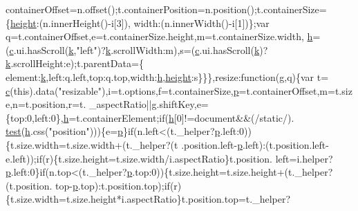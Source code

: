 \begin{DoxyCode}
      containerOffset=n.offset();t.containerPosition=n.position();t.containerSize=\{\hyperlink{styr_2styr_2main_8c_a48083b65ac9a863566dc3e3fff09a5b4}{height}:(n.innerHeight()-i[3]),
      width:(n.innerWidth()-i[1])\};var q=t.containerOffset,e=t.containerSize.height,m=t.containerSize.width,
      \hyperlink{all__1a_8js_aebecdaf2444e2be39f4804412d6a3bf8}{h}=(\hyperlink{jquery_8js_ad171626e81625b5e9f5cb177a3a8fb1c}{c}.ui.hasScroll(\hyperlink{jquery_8js_ab26645c014aa005ecedef329ecf58c99}{k},\textcolor{stringliteral}{"left"})?\hyperlink{jquery_8js_ab26645c014aa005ecedef329ecf58c99}{k}.scrollWidth:m),s=(\hyperlink{jquery_8js_ad171626e81625b5e9f5cb177a3a8fb1c}{c}.ui.hasScroll(\hyperlink{jquery_8js_ab26645c014aa005ecedef329ecf58c99}{k})?\hyperlink{jquery_8js_ab26645c014aa005ecedef329ecf58c99}{k}.scrollHeight:e);t.parentData=\{
      element:\hyperlink{jquery_8js_ab26645c014aa005ecedef329ecf58c99}{k},left:q.left,top:q.top,width:\hyperlink{all__1a_8js_aebecdaf2444e2be39f4804412d6a3bf8}{h},\hyperlink{styr_2styr_2main_8c_a48083b65ac9a863566dc3e3fff09a5b4}{height}:s\}\}\},resize:\textcolor{keyword}{function}(g,q)\{var t=
      \hyperlink{jquery_8js_ad171626e81625b5e9f5cb177a3a8fb1c}{c}(\textcolor{keyword}{this}).data(\textcolor{stringliteral}{"resizable"}),i=t.options,f=t.containerSize,\hyperlink{jquery_8js_a2335e57f79b6acfb6de59c235dc8a83e}{p}=t.containerOffset,m=t.size,n=t.position,r=t.
      \_aspectRatio||g.shiftKey,e=\{top:0,left:0\},\hyperlink{all__1a_8js_aebecdaf2444e2be39f4804412d6a3bf8}{h}=t.containerElement;\textcolor{keywordflow}{if}(\hyperlink{all__1a_8js_aebecdaf2444e2be39f4804412d6a3bf8}{h}[0]!=document&&(/\textcolor{keyword}{static}/).
      \hyperlink{inv__mpu_8c_a1e8f8b1ef7fb2c429e1ce7c2f9985530}{test}(\hyperlink{all__1a_8js_aebecdaf2444e2be39f4804412d6a3bf8}{h}.css(\textcolor{stringliteral}{"position"})))\{e=\hyperlink{jquery_8js_a2335e57f79b6acfb6de59c235dc8a83e}{p}\}\textcolor{keywordflow}{if}(n.left<(t.\_helper?\hyperlink{jquery_8js_a2335e57f79b6acfb6de59c235dc8a83e}{p}.left:0))\{t.size.width=t.size.width+(t.\_helper?(t
      .position.left-\hyperlink{jquery_8js_a2335e57f79b6acfb6de59c235dc8a83e}{p}.left):(t.position.left-e.left));\textcolor{keywordflow}{if}(r)\{t.size.height=t.size.width/i.aspectRatio\}t.position.
      left=i.helper?\hyperlink{jquery_8js_a2335e57f79b6acfb6de59c235dc8a83e}{p}.left:0\}\textcolor{keywordflow}{if}(n.top<(t.\_helper?\hyperlink{jquery_8js_a2335e57f79b6acfb6de59c235dc8a83e}{p}.top:0))\{t.size.height=t.size.height+(t.\_helper?(t.position.
      top-\hyperlink{jquery_8js_a2335e57f79b6acfb6de59c235dc8a83e}{p}.top):t.position.top);\textcolor{keywordflow}{if}(r)\{t.size.width=t.size.height*i.aspectRatio\}t.position.top=t.\_helper?

\end{DoxyCode}

